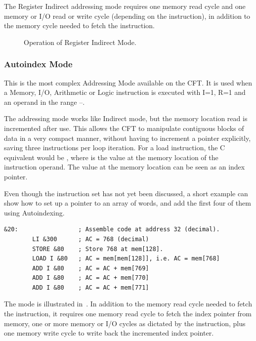 The Register Indirect addressing mode requires one memory read cycle and one
memory or I/O read or write cycle (depending on the instruction), in addition
to the memory cycle needed to fetch the instruction.

\begin{figure}[htb]
 \centering
\caption[Register Indirect Mode]{\label{fig:register-indirect-mode} Operation
  of Register Indirect Mode.}
\end{figure}


\subsubsection{Autoindex Mode}
\label{sec:autoindex-mode}

This is the most complex \gls{Addressing Mode} available on the
CFT. It is used when a Memory, I/O, Arithmetic or Logic instruction is
executed with I=1, R=1 and an operand in the range
–.

The addressing mode works like Indirect mode, but the memory location read is
incremented after use. This allows the CFT to manipulate contiguous blocks of
data in a very compact manner, without having to increment a pointer
explicitly, saving three instructions per loop iteration. For a load
instruction, the C equivalent would be , where
 is the value at the memory location of the instruction operand. The
value at the memory location can be seen as an index pointer.

Even though the instruction set has not yet been discussed, a short example can
show how to set up a pointer to an array of words, and add the first four of
them using Autoindexing.

\begin{lstlisting}[language=cftasm]
&20:                 ; Assemble code at address 32 (decimal).
        LI &300      ; AC = 768 (decimal)
        STORE &80    ; Store 768 at mem[128].
        LOAD I &80   ; AC = mem[mem[128]], i.e. AC = mem[768]
        ADD I &80    ; AC = AC + mem[769]
        ADD I &80    ; AC = AC + mem[770]
        ADD I &80    ; AC = AC + mem[771]
\end{lstlisting}

The mode is illustrated in~. In addition to the memory
read cycle needed to fetch the instruction, it requires one memory read cycle
to fetch the index pointer from memory, one or more memory or I/O cycles as
dictated by the instruction, plus one memory write cycle to write back the
incremented index pointer.


